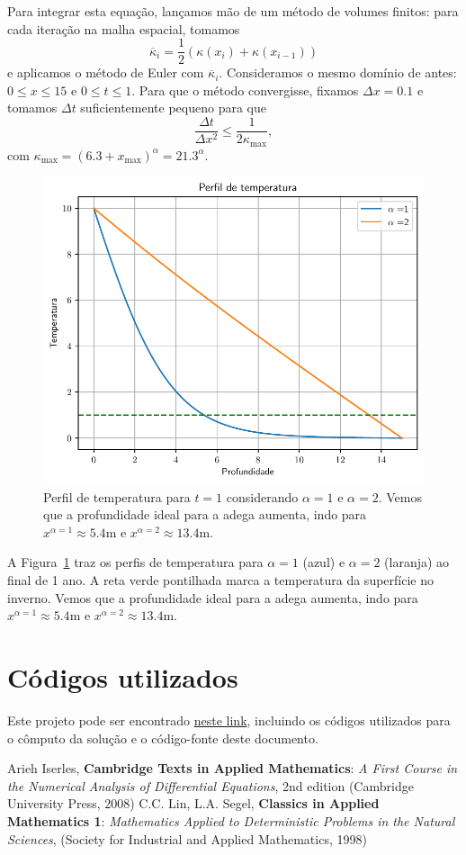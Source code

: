\documentclass[twocolumn,showpacs,%
  nofootinbib,aps,superscriptaddress,%
  eqsecnum,prd,notitlepage,showkeys,10pt]{revtex4-1} %
\renewcommand{\leq}{\leqslant}
\begin{document}
	Para integrar esta equação, lançamos mão de um método de volumes finitos: para cada iteração na malha espacial,
	tomamos
	\begin{equation}
		\overline{\kappa}_i = \frac{1}{2}\left( \kappa(x_{i}) + \kappa(x_{i-1}) \right)
	\end{equation}
	e aplicamos o método de Euler com $\overline{\kappa}_i$. Consideramos o mesmo domínio de antes: $0 \leq x \leq 15$ e $0 \leq t \leq 1$.
	Para que o método convergisse, fixamos $\Delta x = 0.1$ e tomamos
	$\Delta t$ suficientemente pequeno para que
	\begin{equation}
		\frac{\Delta t}{\Delta x^2} \leq \frac{1}{2\kappa_{\max}},
	\end{equation}
	com $\kappa_{\max} = {(6.3 + x_{\max})}^{\alpha} = 21.3^{\alpha}$.
	\begin{figure}[t]%
		\label{fig:FVM}
		\includegraphics[width=.45\textwidth]{Codes/FVM.pdf}
		\caption{Perfil de temperatura para $t=1$ considerando $\alpha = 1$ e $\alpha = 2$.
		Vemos que a profundidade ideal para a adega aumenta, indo para $x^{\alpha=1} \approx 5.4$m
		e $x^{\alpha=2} \approx 13.4$m.}
	\end{figure}
	A Figura~\ref{fig:FVM} traz os perfis de temperatura para $\alpha=1$ (azul)
	e $\alpha = 2$ (laranja) ao final de 1 ano. A reta verde pontilhada marca a temperatura da superfície no inverno.
	Vemos que a profundidade ideal para a adega aumenta, indo para $x^{\alpha=1} \approx 5.4$m
	e $x^{\alpha=2} \approx 13.4$m.
%
\section{Códigos utilizados}
%
	Este projeto pode ser encontrado
	\href{https://github.com/CaioTomas/Trabalho-IMCEDP}{neste link},
	incluindo os códigos utilizados para o cômputo da solução e o código-fonte
	deste documento.


% 

\begin{thebibliography}{9}
	 Arieh Iserles, \textbf{Cambridge Texts in Applied Mathematics}: \textit{A First Course in the Numerical Analysis of Differential Equations}, 2nd edition (Cambridge University Press, 2008)
	 C.C. Lin, L.A. Segel, \textbf{Classics in Applied Mathematics 1}: \textit{Mathematics Applied to Deterministic Problems in the Natural Sciences}, (Society for Industrial and Applied Mathematics, 1998)
\end{thebibliography}
\end{document}
